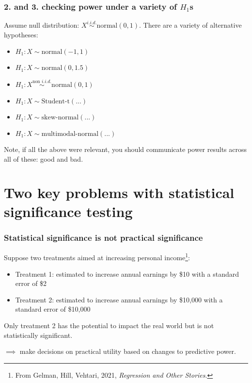 \documentclass[handout]{beamer}
\begin{document}
\begin{frame}
	\frametitle{2. and 3. checking power under a variety of $H_1$s}
	
	Assume null distribution: $X \stackrel{i.i.d.}{\sim} \text{normal}(0, 1)$. There are a variety of alternative hypotheses:
	
	\begin{itemize}
		\item $H_1: X \sim \text{normal}(-1, 1)$
		\item $H_1: X \sim \text{normal}(0, 1.5)$
		\item $H_1: X \stackrel{\text{non } i.i.d.}{\sim} \text{normal}(0, 1)$
		\item $H_1: X\sim \text{Student-t}(...)$
		\item $H_1: X \sim \text{skew-normal}(...)$
		\item $H_1: X \sim \text{multimodal-normal}(...)$
	\end{itemize}
	
	Note, if all the above were relevant, you should communicate power results across all of these: good and bad.
	
\end{frame}

\section{Two key problems with statistical significance testing}
\frame{\tableofcontents[currentsection]}

\begin{frame}
	\frametitle{Statistical significance is not practical significance}
	
	Suppose two treatments aimed at increasing personal income\footnote{From Gelman, Hill, Vehtari, 2021, \textit{Regression and Other Stories}.}:
	
	\begin{itemize}
		\item Treatment 1: estimated to increase annual earnings by \$10 with a standard error of \$2
		\item Treatment 2: estimated to increase annual earnings by \$10,000 with a standard error of \$10,000
	\end{itemize}
	
	Only treatment 2 has the potential to impact the real world but is not statistically significant.
	
	$\implies$ make decisions on practical utility based on changes to predictive power.
	
\end{frame}
\end{document}

